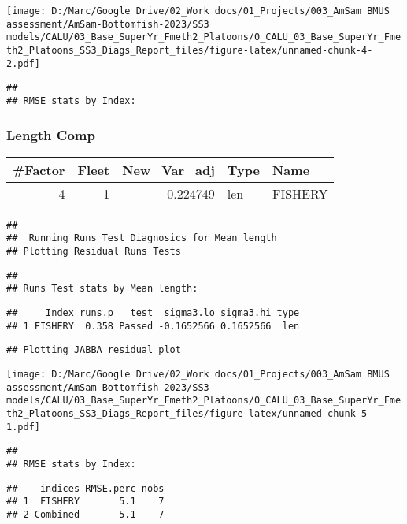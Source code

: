 \documentclass[
]{article}
\begin{document}
\texttt{[image: D:/Marc/Google Drive/02\_Work docs/01\_Projects/003\_AmSam BMUS assessment/AmSam-Bottomfish-2023/SS3 models/CALU/03\_Base\_SuperYr\_Fmeth2\_Platoons/0\_CALU\_03\_Base\_SuperYr\_Fmeth2\_Platoons\_SS3\_Diags\_Report\_files/figure-latex/unnamed-chunk-4-2.pdf]}

\begin{verbatim}
## 
## RMSE stats by Index:
\end{verbatim}

\hypertarget{length-comp}{%
\subsubsection{Length Comp}\label{length-comp}}

\captionsetup[table]{labelformat=empty,skip=1pt}
\begin{longtable}{rrrll}
\toprule
\#Factor & Fleet & New\_Var\_adj & Type & Name \\ 
\midrule
4 & 1 & 0.224749 & len & FISHERY \\ 
\bottomrule
\end{longtable}

\begin{verbatim}
## 
##  Running Runs Test Diagnosics for Mean length 
## Plotting Residual Runs Tests
\end{verbatim}

\begin{verbatim}
## 
## Runs Test stats by Mean length:
\end{verbatim}

\begin{verbatim}
##     Index runs.p   test  sigma3.lo sigma3.hi type
## 1 FISHERY  0.358 Passed -0.1652566 0.1652566  len
\end{verbatim}

\begin{verbatim}
## Plotting JABBA residual plot
\end{verbatim}

\texttt{[image: D:/Marc/Google Drive/02\_Work docs/01\_Projects/003\_AmSam BMUS assessment/AmSam-Bottomfish-2023/SS3 models/CALU/03\_Base\_SuperYr\_Fmeth2\_Platoons/0\_CALU\_03\_Base\_SuperYr\_Fmeth2\_Platoons\_SS3\_Diags\_Report\_files/figure-latex/unnamed-chunk-5-1.pdf]}

\begin{verbatim}
## 
## RMSE stats by Index:
\end{verbatim}

\begin{verbatim}
##    indices RMSE.perc nobs
## 1  FISHERY       5.1    7
## 2 Combined       5.1    7
\end{verbatim}
\end{document}
